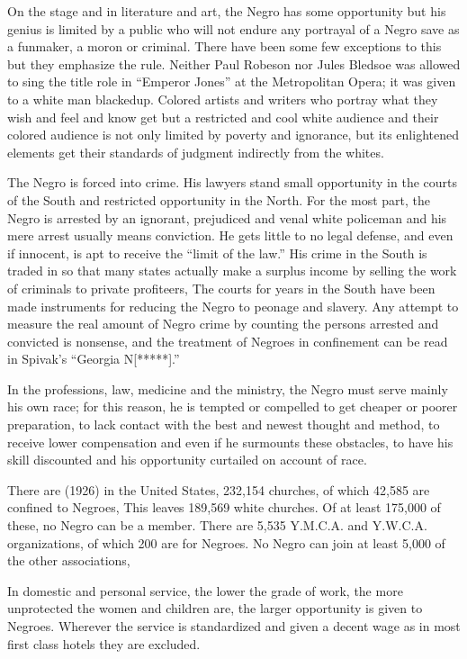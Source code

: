 \documentclass[letterpaper,10pt,english]{jupyterBook}
\begin{document}
\sphinxAtStartPar
On the stage and in literature and art, the Negro has some opportunity but his genius is limited by a public who will not endure any portrayal of a Negro save as a fun\sphinxhyphen{}maker, a moron or criminal. There have been some few exceptions to this but they emphasize the rule. Neither Paul Robeson nor Jules Bledsoe was allowed to sing the title role in “Emperor Jones” at the Metropolitan Opera; it was given to a white man blacked\sphinxhyphen{}up. Colored artists and writers who portray what they wish and feel and know get but a restricted and cool white audience and their colored audience is not only limited by poverty and ignorance, but its enlightened elements get their standards of judgment indirectly from the whites.

\sphinxAtStartPar
The Negro is forced into crime. His lawyers stand small opportunity in the courts of the South and restricted opportunity in the North. For the most part, the Negro is arrested by an ignorant, prejudiced and venal white policeman and his mere arrest usually means conviction. He gets little to no legal defense, and even if innocent, is apt to receive the “limit of the law.” His crime in the South is traded in so that many states actually make a surplus income by selling the work of criminals to private profiteers, The courts for years in the South have been made instruments for reducing the Negro to peonage and slavery. Any attempt to measure the real amount of Negro crime by counting the persons arrested and convicted is nonsense, and the treatment of Negroes in confinement can be read in Spivak’s “Georgia N{[}*****{]}.”

\sphinxAtStartPar
In the professions, law, medicine and the ministry, the Negro must serve mainly his own race; for this reason, he is tempted or compelled to get cheaper or poorer preparation, to lack contact with the best and newest thought and method, to receive lower compensation and even if he surmounts these obstacles, to have his skill discounted and his opportunity curtailed on account of race.

\sphinxAtStartPar
There are (1926) in the United States, 232,154 churches, of which 42,585 are confined to Negroes, This leaves 189,569 white churches. Of at least 175,000 of these, no Negro can be a member. There are 5,535 Y.M.C.A. and Y.W.C.A. organizations, of which 200 are for Negroes. No Negro can join at least 5,000 of the other associations,

\sphinxAtStartPar
In domestic and personal service, the lower the grade of work, the more unprotected the women and children are, the larger opportunity is given to Negroes. Wherever the service is standardized and given a decent wage as in most first class hotels they are excluded.
\end{document}
